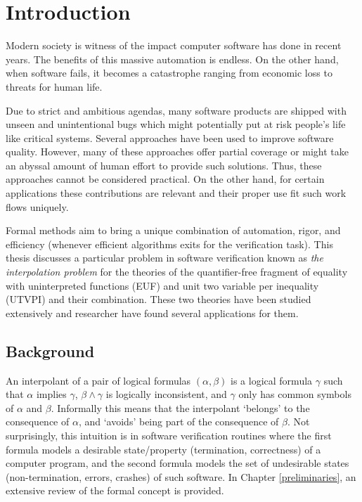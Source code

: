 \chapter{Introduction}

Modern society is witness of the impact computer software 
has done in recent years. The benefits of this massive 
automation is endless. On the other hand, when software 
fails, it becomes a catastrophe ranging from economic loss
to threats for human life. 

Due to strict and ambitious agendas, many software products
are shipped with unseen and unintentional bugs which might potentially put
at risk people's life like critical systems. Several approaches have been 
used to improve software quality. However, many of these approaches 
offer partial coverage or might take an abyssal amount of human effort to 
provide such solutions. Thus, these approaches cannot be considered practical. 
On the other hand, for certain applications these contributions are relevant
and their proper use fit such work flows uniquely.

Formal methods aim to bring a unique combination of automation, rigor, and 
efficiency (whenever efficient algorithms exits for the verification task). 
This thesis discusses a particular problem in software verification
known as \emph{the interpolation problem} for the theories of the quantifier-free
fragment of equality with uninterpreted functions (EUF) and unit two variable per
inequality (UTVPI) and their combination. These two theories have been 
studied extensively and researcher have found several applications for them. 

\section{Background}

An interpolant of a pair of logical formulas $(\alpha, \beta)$ 
is a logical formula $\gamma$
such that $\alpha$ implies $\gamma$, $\beta \land \gamma$ is logically
inconsistent, and $\gamma$ only has common symbols of $\alpha$ and $\beta$.
Informally this means that the 
interpolant `belongs' to the consequence of $\alpha$, 
and `avoids' being part of the consequence of $\beta$. 
Not surprisingly, this intuition is in software verification 
routines where the first formula models a desirable state/property
(termination, correctness) of a computer program, and the second 
formula models the set of undesirable states (non-termination, 
errors, crashes) of such software. In Chapter 
\ref{preliminaries}, an extensive review of the formal concept 
is provided.

